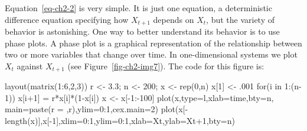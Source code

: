\documentclass[
  a4paper,
  DIV=11,
  numbers=noendperiod,
  oneside]{scrreprt}
\newenvironment{Shaded}{\begin{snugshade}}{\end{snugshade}}
\newcommand{\AttributeTok}[1]{\textcolor[rgb]{0.40,0.45,0.13}{#1}}
\newcommand{\ControlFlowTok}[1]{\textcolor[rgb]{0.00,0.23,0.31}{#1}}
\newcommand{\DecValTok}[1]{\textcolor[rgb]{0.68,0.00,0.00}{#1}}
\newcommand{\FloatTok}[1]{\textcolor[rgb]{0.68,0.00,0.00}{#1}}
\newcommand{\FunctionTok}[1]{\textcolor[rgb]{0.28,0.35,0.67}{#1}}
\newcommand{\NormalTok}[1]{\textcolor[rgb]{0.00,0.23,0.31}{#1}}
\newcommand{\OtherTok}[1]{\textcolor[rgb]{0.00,0.23,0.31}{#1}}
\newcommand{\SpecialCharTok}[1]{\textcolor[rgb]{0.37,0.37,0.37}{#1}}
\newcommand{\StringTok}[1]{\textcolor[rgb]{0.13,0.47,0.30}{#1}}
\begin{document}
Equation~\ref{eq-ch2-2} is very simple. It is just one equation, a
deterministic difference equation specifying how \(X_{t + 1}\) depends
on \(X_{t}\), but the variety of behavior is astonishing. One way to
better understand its behavior is to use phase plots. A phase plot is a
graphical representation of the relationship between two or more
variables that change over time. In one-dimensional systems we plot
\(X_{t}\) against \(X_{t + 1}\) (see Figure~\ref{fig-ch2-img7}). The
code for this figure is:

\begin{Shaded}
\begin{Highlighting}[]
\FunctionTok{layout}\NormalTok{(}\FunctionTok{matrix}\NormalTok{(}\DecValTok{1}\SpecialCharTok{:}\DecValTok{6}\NormalTok{,}\DecValTok{2}\NormalTok{,}\DecValTok{3}\NormalTok{))}
\NormalTok{r }\OtherTok{\textless{}{-}} \FloatTok{3.3}\NormalTok{; n }\OtherTok{\textless{}{-}} \DecValTok{200}\NormalTok{; x }\OtherTok{\textless{}{-}} \FunctionTok{rep}\NormalTok{(}\DecValTok{0}\NormalTok{,n)}
\NormalTok{x[}\DecValTok{1}\NormalTok{] }\OtherTok{\textless{}{-}}\NormalTok{ .}\DecValTok{001}
\ControlFlowTok{for}\NormalTok{(i }\ControlFlowTok{in} \DecValTok{1}\SpecialCharTok{:}\NormalTok{(n}\DecValTok{{-}1}\NormalTok{)) x[i}\SpecialCharTok{+}\DecValTok{1}\NormalTok{] }\OtherTok{=}\NormalTok{ r}\SpecialCharTok{*}\NormalTok{x[i]}\SpecialCharTok{*}\NormalTok{(}\DecValTok{1}\SpecialCharTok{{-}}\NormalTok{x[i])}
\NormalTok{x }\OtherTok{\textless{}{-}}\NormalTok{ x[}\SpecialCharTok{{-}}\DecValTok{1}\SpecialCharTok{:{-}}\DecValTok{100}\NormalTok{]}
\FunctionTok{plot}\NormalTok{(x,}\AttributeTok{type=}\StringTok{\textquotesingle{}l\textquotesingle{}}\NormalTok{,}\AttributeTok{xlab=}\StringTok{\textquotesingle{}time\textquotesingle{}}\NormalTok{,}\AttributeTok{bty=}\StringTok{\textquotesingle{}n\textquotesingle{}}\NormalTok{, }\AttributeTok{main=}\FunctionTok{paste}\NormalTok{(}\StringTok{\textquotesingle{}r = \textquotesingle{}}\NormalTok{,r),}\AttributeTok{ylim=}\DecValTok{0}\SpecialCharTok{:}\DecValTok{1}\NormalTok{,}\AttributeTok{cex.main=}\DecValTok{2}\NormalTok{) }
\FunctionTok{plot}\NormalTok{(x[}\SpecialCharTok{{-}}\FunctionTok{length}\NormalTok{(x)],x[}\SpecialCharTok{{-}}\DecValTok{1}\NormalTok{],}\AttributeTok{xlim=}\DecValTok{0}\SpecialCharTok{:}\DecValTok{1}\NormalTok{,}\AttributeTok{ylim=}\DecValTok{0}\SpecialCharTok{:}\DecValTok{1}\NormalTok{,}\AttributeTok{xlab=}\StringTok{\textquotesingle{}Xt\textquotesingle{}}\NormalTok{,}\AttributeTok{ylab=}\StringTok{\textquotesingle{}Xt+1\textquotesingle{}}\NormalTok{,}\AttributeTok{bty=}\StringTok{\textquotesingle{}n\textquotesingle{}}\NormalTok{)}

\end{Highlighting}
\end{Shaded}
\end{document}
